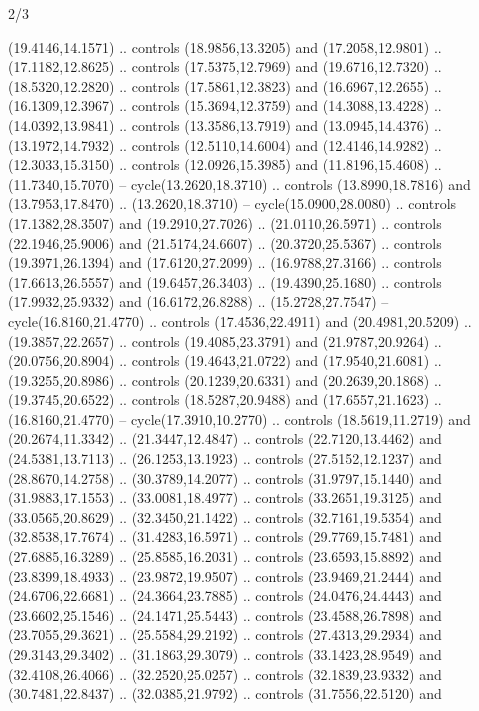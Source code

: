 \begin{flagdescription}{2/3}
\begin{scope}[yshift=\flagwidth,scale=\flagwidth/1241.93737]
\begin{scope}[y=-1mm, x=1mm,draw=gold,fill=blue,line join=miter,miter limit=4,line width=1.8\lw]
\begin{scope}[y=1mm, x=1mm, yscale=-1,shift={(573.68mm+\str,145.75)}]
\begin{scope}[scale=1.35,shift={(-9,-3)}]
\begin{scope}[scale=0.55]
\begin{scope}[scale=1.333]
    (19.4146,14.1571) .. controls (18.9856,13.3205) and (17.2058,12.9801) ..
    (17.1182,12.8625) .. controls (17.5375,12.7969) and (19.6716,12.7320) ..
    (18.5320,12.2820) .. controls (17.5861,12.3823) and (16.6967,12.2655) ..
    (16.1309,12.3967) .. controls (15.3694,12.3759) and (14.3088,13.4228) ..
    (14.0392,13.9841) .. controls (13.3586,13.7919) and (13.0945,14.4376) ..
    (13.1972,14.7932) .. controls (12.5110,14.6004) and (12.4146,14.9282) ..
    (12.3033,15.3150) .. controls (12.0926,15.3985) and (11.8196,15.4608) ..
    (11.7340,15.7070) -- cycle(13.2620,18.3710) .. controls (13.8990,18.7816) and
    (13.7953,17.8470) .. (13.2620,18.3710) -- cycle(15.0900,28.0080) .. controls
    (17.1382,28.3507) and (19.2910,27.7026) .. (21.0110,26.5971) .. controls
    (22.1946,25.9006) and (21.5174,24.6607) .. (20.3720,25.5367) .. controls
    (19.3971,26.1394) and (17.6120,27.2099) .. (16.9788,27.3166) .. controls
    (17.6613,26.5557) and (19.6457,26.3403) .. (19.4390,25.1680) .. controls
    (17.9932,25.9332) and (16.6172,26.8288) .. (15.2728,27.7547) --
    cycle(16.8160,21.4770) .. controls (17.4536,22.4911) and (20.4981,20.5209) ..
    (19.3857,22.2657) .. controls (19.4085,23.3791) and (21.9787,20.9264) ..
    (20.0756,20.8904) .. controls (19.4643,21.0722) and (17.9540,21.6081) ..
    (19.3255,20.8986) .. controls (20.1239,20.6331) and (20.2639,20.1868) ..
    (19.3745,20.6522) .. controls (18.5287,20.9488) and (17.6557,21.1623) ..
    (16.8160,21.4770) -- cycle(17.3910,10.2770) .. controls (18.5619,11.2719) and
    (20.2674,11.3342) .. (21.3447,12.4847) .. controls (22.7120,13.4462) and
    (24.5381,13.7113) .. (26.1253,13.1923) .. controls (27.5152,12.1237) and
    (28.8670,14.2758) .. (30.3789,14.2077) .. controls (31.9797,15.1440) and
    (31.9883,17.1553) .. (33.0081,18.4977) .. controls (33.2651,19.3125) and
    (33.0565,20.8629) .. (32.3450,21.1422) .. controls (32.7161,19.5354) and
    (32.8538,17.7674) .. (31.4283,16.5971) .. controls (29.7769,15.7481) and
    (27.6885,16.3289) .. (25.8585,16.2031) .. controls (23.6593,15.8892) and
    (23.8399,18.4933) .. (23.9872,19.9507) .. controls (23.9469,21.2444) and
    (24.6706,22.6681) .. (24.3664,23.7885) .. controls (24.0476,24.4443) and
    (23.6602,25.1546) .. (24.1471,25.5443) .. controls (23.4588,26.7898) and
    (23.7055,29.3621) .. (25.5584,29.2192) .. controls (27.4313,29.2934) and
    (29.3143,29.3402) .. (31.1863,29.3079) .. controls (33.1423,28.9549) and
    (32.4108,26.4066) .. (32.2520,25.0257) .. controls (32.1839,23.9332) and
    (30.7481,22.8437) .. (32.0385,21.9792) .. controls (31.7556,22.5120) and

\end{scope}
\end{scope}
\end{scope}
\end{scope}
\end{scope}
\end{scope}
\end{flagdescription}
